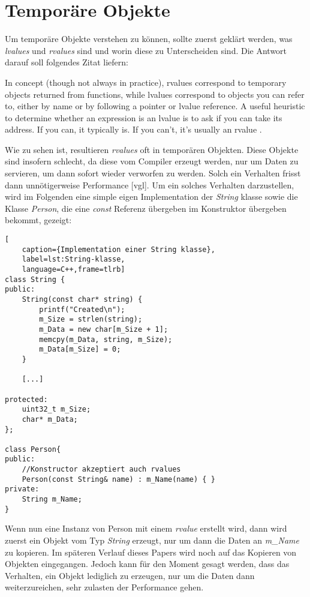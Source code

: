 \section{Temporäre Objekte}\label{sec:tempobj}
Um temporäre Objekte verstehen zu können, sollte zuerst geklärt werden, was \emph{lvalues} und
\emph{rvalues} sind und worin diese zu Unterscheiden sind. Die Antwort darauf soll folgendes
Zitat liefern:
\begin{zitat}
    In concept (though not always in practice), rvalues correspond to temporary
    objects returned from functions, while lvalues correspond to objects you can refer to, either by
    name or by following a pointer or lvalue reference. A useful heuristic to determine whether an
    expression is an lvalue is to ask if you can take its address. If you can, it typically is. If
    you can’t, it’s usually an rvalue \cite{EffectiveC++}.
\end{zitat}
Wie zu sehen ist, resultieren \emph{rvalues} oft in temporären Objekten. Diese Objekte sind
insofern schlecht, da diese vom Compiler erzeugt werden, nur um Daten zu servieren, um dann sofort
wieder verworfen zu werden. Solch ein Verhalten frisst dann unnötigerweise Performance
\cite{HandsOn}[vgl].
\newline
\newline
Um ein solches Verhalten darzustellen, wird im Folgenden eine simple eigen Implementation der
\emph{String} klasse sowie die Klasse \emph{Person}, die eine \emph{const} Referenz übergeben im
Konstruktor übergeben bekommt, gezeigt:

\begin{lstlisting}[
    caption={Implementation einer String klasse},
    label=lst:String-klasse,
    language=C++,frame=tlrb]
class String {
public:
	String(const char* string) {
		printf("Created\n");
		m_Size = strlen(string);
		m_Data = new char[m_Size + 1];
		memcpy(m_Data, string, m_Size);
		m_Data[m_Size] = 0;
	}

	[...]

protected:
    uint32_t m_Size;
    char* m_Data;
};

class Person{
public:
	//Konstructor akzeptiert auch rvalues
	Person(const String& name) : m_Name(name) { }
private:
	String m_Name;
}
\end{lstlisting}

Wenn nun eine Instanz von Person mit einem \emph{rvalue} erstellt wird, dann wird zuerst ein
Objekt vom Typ \emph{String} erzeugt, nur um dann die Daten an \emph{m\_Name} zu kopieren. Im
späteren Verlauf dieses Papers wird noch auf das Kopieren von Objekten eingegangen. Jedoch kann
für den Moment gesagt werden, dass das Verhalten, ein Objekt lediglich zu erzeugen, nur um die
Daten dann weiterzureichen, sehr zulasten der Performance gehen.